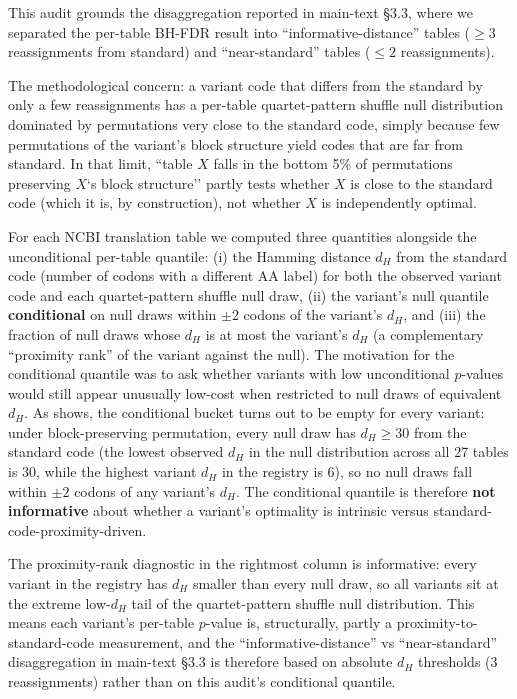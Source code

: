 \documentclass[preprint,11pt,authoryear,a4paper]{elsarticle}
\begin{document}
This audit grounds the disaggregation reported in main-text §3.3, where
we separated the per-table BH-FDR result into ``informative-distance''
tables (\(\geq 3\) reassignments from standard) and ``near-standard''
tables (\(\leq 2\) reassignments).

The methodological concern: a variant code that differs from the
standard by only a few reassignments has a per-table quartet-pattern
shuffle null distribution dominated by permutations very close to the
standard code, simply because few permutations of the variant's block
structure yield codes that are far from standard. In that limit, ``table
\(X\) falls in the bottom 5\% of permutations preserving \(X\)`s block
structure'' partly tests whether \(X\) is close to the standard code
(which it is, by construction), not whether \(X\) is independently
optimal.

For each NCBI translation table we computed three quantities alongside
the unconditional per-table quantile: (i) the Hamming distance \(d_{H}\)
from the standard code (number of codons with a different AA label) for
both the observed variant code and each quartet-pattern shuffle null
draw, (ii) the variant's null quantile \textbf{conditional} on null
draws within \(\pm 2\) codons of the variant's \(d_{H}\), and (iii) the
fraction of null draws whose \(d_{H}\) is at most the variant's
\(d_{H}\) (a complementary ``proximity rank'' of the variant against the
null). The motivation for the conditional quantile was to ask whether
variants with low unconditional \(p\)-values would still appear
unusually low-cost when restricted to null draws of equivalent
\(d_{H}\). As  shows, the conditional bucket
turns out to be empty for every variant: under block-preserving
permutation, every null draw has \(d_{H} \geq 30\) from the standard
code (the lowest observed \(d_{H}\) in the null distribution across all
27 tables is 30, while the highest variant \(d_{H}\) in the registry is
6), so no null draws fall within \(\pm 2\) codons of any variant's
\(d_{H}\). The conditional quantile is therefore \textbf{not
informative} about whether a variant's optimality is intrinsic versus
standard-code-proximity-driven.

The proximity-rank diagnostic in the rightmost column is informative:
every variant in the registry has \(d_{H}\) smaller than every null
draw, so all variants sit at the extreme low-\(d_{H}\) tail of the
quartet-pattern shuffle null distribution. This means each variant's
per-table \(p\)-value is, structurally, partly a
proximity-to-standard-code measurement, and the ``informative-distance''
vs ``near-standard'' disaggregation in main-text §3.3 is therefore based
on absolute \(d_{H}\) thresholds (3 reassignments) rather than on this
audit's conditional quantile.
\end{document}
